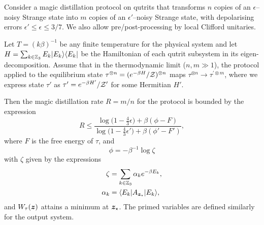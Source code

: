 \documentclass[pra,
aps,
twocolumn,
superscriptaddress,
groupedaddress,
nofootinbib,
reprint
]{revtex4-1}
\begin{document}
\begingroup
\def\thetheorem{\ref{thm:free-energy}}
\begin{theorem}
	Consider a magic distillation protocol on qutrits that transforms $n$ copies of an $\epsilon$--noisy Strange state into $m$ copies of an $\epsilon'$--noisy Strange state, with depolarising errors $\epsilon' \leq \epsilon \leq 3/7$. We also allow pre/post-processing by local Clifford unitaries.
	
	Let $T =(k\beta)^{-1}$ be any finite temperature for the physical system and let $H= \sum_{k \in \mathbb{Z}_3} E_k |E_k\rangle\langle E_k|$ be the Hamiltonian of each qutrit subsystem in its eigen-decomposition.
Assume that in the thermodynamic limit ($n,m \gg 1$), the protocol applied to the equilibrium state $\tau^{\otimes n} = (e^{-\beta H}/\mathcal{Z})^{\otimes n}$ maps $\tau^{\otimes n} \longrightarrow \tau^{\prime \otimes m}$, where we express state $\tau'$ as $\tau' = e^{-\beta H'}/\mathcal{Z}'$ for some Hermitian $H'$.

Then the magic distillation rate $R = m/n$ for the protocol is bounded by the expression
\begin{equation}
	R \leq \dfrac{\log \big( 1-\frac{4}{3}\epsilon \big) + \beta (\phi - F)}{\log \big( 1-\frac{4}{3}\epsilon' \big) + \beta (\phi' - F')},
\end{equation}
where $F$ is the free energy of $\tau$,  and 
\begin{equation}
	\phi = -\beta^{-1} \log \zeta
\end{equation}
with $\zeta$ given by the expressions
\begin{align}
	\zeta &= \sum_{k\in \mathbb{Z}_3} \alpha_k e^{-\beta E_k}, \nonumber\\
	\alpha_k &= \langle E_k| A_{\bm{z}_\star} |E_k\rangle,
\end{align}
and $W_\tau(\bm{z})$ attains a minimum at $\boldsymbol{z}_\star$. The primed variables are defined similarly for the output system.
\end{theorem}
\addtocounter{theorem}{-1}
\endgroup
\end{document}
